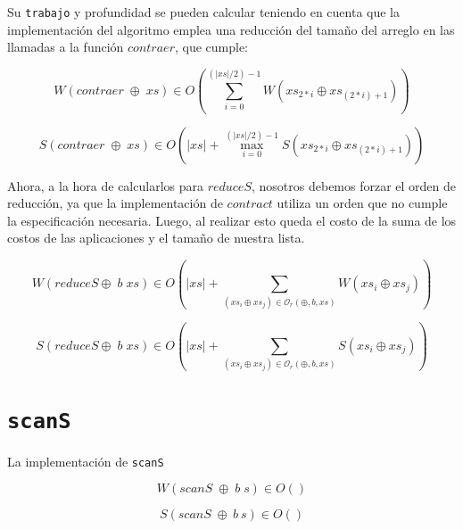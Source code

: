\documentclass[a4paper,10pt]{article}
\begin{document}
    Su \texttt{trabajo} y profundidad se pueden calcular teniendo en cuenta 
que la implementación del algoritmo emplea una reducción del tamaño del 
arreglo en las llamadas a la función $contraer$, que cumple:

\begin{equation*}
    W \left( contraer\; \oplus \;xs \right) \in
    O \left( \sum_{i=0}^{(\vert xs \vert /2 )-1} W \left( xs_{2*i} \oplus xs_{(2*i) +1} \right) \right)
\end{equation*}

\begin{equation*}
    S \left( contraer\; \oplus \;xs \right) \in
    O \left( \vert xs \vert + \max_{i=0}^{(\vert xs \vert /2 )-1} S \left( xs_{2*i} \oplus xs_{(2*i) +1} \right) \right)
\end{equation*}

\bigskip

    Ahora, a la hora de calcularlos para $reduceS$, nosotros debemos forzar
el orden de reducción, ya que la implementación de $contract$ utiliza un orden
que no cumple la especificación necesaria. Luego, al realizar esto queda el costo
de la suma de los costos de las aplicaciones y el tamaño de nuestra lista.

\begin{equation*}
    W \left( reduceS \oplus \; b \; xs \right) \in
    O \left( \vert xs \vert + \sum_{(xs_i \oplus xs_j) \in \mathcal{O}_r(\oplus,b,xs)} W \left( xs_i \oplus xs_j \right) \right)
\end{equation*}

\begin{equation*}
    S \left( reduceS \oplus \; b \; xs \right) \in
    O \left( \vert xs \vert + \sum_{(xs_i \oplus xs_j) \in \mathcal{O}_r(\oplus,b,xs)} S \left( xs_i \oplus xs_j \right) \right)
\end{equation*}


\bigskip

\section*{\texttt{scanS}}

    La implementación de \texttt{scanS}

\begin{equation*}
    W \left( scanS\; \oplus \;b \;s \right) \in
    O \left( \right) 
\end{equation*}

\begin{equation*}
    S \left( scanS\; \oplus \:b \:s \right) \in
    O \left( \right)
\end{equation*}
\end{document}
